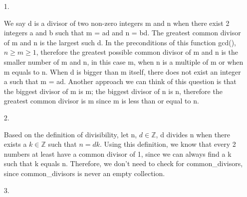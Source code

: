 \documentclass[11pt]{article}
\begin{document}
\begin{enumerate}
\item[1.]

We say d is a divisor of two non-zero integers m and n when there exist 2 integers a and b such that m = ad and n = bd. The greatest common divisor of m and n is the largest such d. In the preconditions of this function gcd(), $n \geq m \geq 1$, therefore the greatest possible common divisor of m and n is the smaller number of m and n, in this case m, when n is a multiple of m or when m equals to n. When d is bigger than m itself, there does not exist an integer a such that m = ad. Another approach we can think of this question is that the biggest divisor of m is m; the biggest divisor of n is n, therefore the greatest common divisor is m since m is less than or equal to n.


\item[2.]

Based on the definition of divisibility, let n, $d \in \mathbb{Z}$, d divides n when there exists a $k \in \mathbb{Z}$ such that $n = dk$. Using this definition, we know that every 2 numbers at least have a common divisor of 1, since we can always find a k such that k equals n. Therefore, we don't need to check for common\_divisors, since common\_divisors is never an empty collection.

\item[3.]


\end{enumerate}
\end{document}
